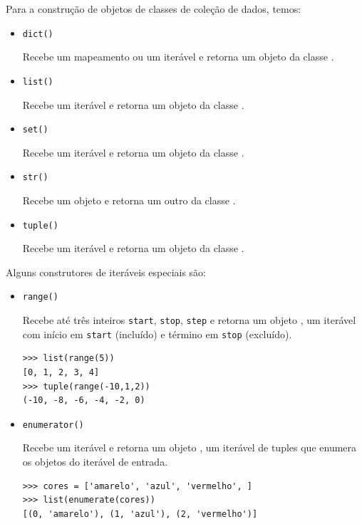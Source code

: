 Para a construção de objetos de classes de coleção de dados, temos:
\begin{itemize}
\item \lstinline+dict()+ 

  Recebe um mapeamento ou um iterável e retorna um objeto da classe {\PYTHONdict}.

\item \lstinline+list()+ 

  Recebe um iterável e retorna um objeto da classe {\PYTHONlist}.

\item \lstinline+set()+ 

  Recebe um iterável e retorna um objeto da classe {\PYTHONset}.

\item \lstinline+str()+ 

  Recebe um objeto e retorna um outro da classe {\PYTHONstr}.

\item \lstinline+tuple()+ 

  Recebe um iterável e retorna um objeto da classe {\PYTHONtuple}.
\end{itemize}

Alguns construtores de iteráveis especiais são:
\begin{itemize}
\item \lstinline+range()+ 

  Recebe até três inteiros \lstinline+start+, \lstinline+stop+, \lstinline+step+ e retorna um objeto {\PYTHONrange}, um iterável com início em \lstinline+start+ (incluído) e término em \lstinline+stop+ (excluído).

\begin{lstlisting}[xrightmargin=2.5em]
>>> list(range(5))
[0, 1, 2, 3, 4]
>>> tuple(range(-10,1,2))
(-10, -8, -6, -4, -2, 0)
\end{lstlisting}

\item \lstinline+enumerator()+ 

  Recebe um iterável e retorna um objeto {\PYTHONenumerate}, um iterável de tuples que enumera os objetos do iterável de entrada.

\begin{lstlisting}[xrightmargin=2.5em]
>>> cores = ['amarelo', 'azul', 'vermelho', ]
>>> list(enumerate(cores))
[(0, 'amarelo'), (1, 'azul'), (2, 'vermelho')]
\end{lstlisting}

\end{itemize}

